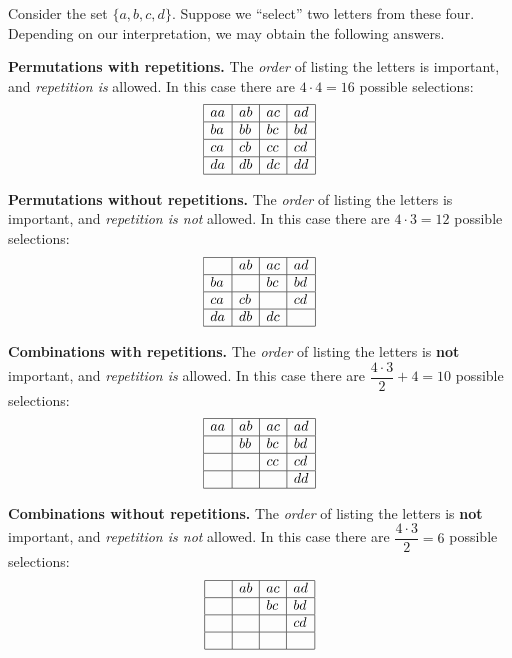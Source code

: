 \begin{exa}
Consider the set $\{a, b, c, d\}$. Suppose we ``select'' two
letters from these four. Depending on our interpretation, we may
obtain the following answers.
\begin{lenum}
\item {\bf Permutations with repetitions.} The {\em order} of listing the letters is important, and
{\em repetition is} allowed. In this case there are $4\cdot 4 =
16$ possible selections: $$\begin{array}{|l|l|l|l|}\hline aa & ab
& ac & ad
\\ \hline ba & bb & bc & bd \\ \hline ca & cb & cc & cd \\ \hline da & db & dc & dd \\ \hline\end{array}
$$
\item {\bf Permutations without repetitions.} The {\em order} of listing the letters is important, and
{\em repetition is not} allowed. In this case there are $4\cdot 3
= 12$ possible selections: $$\begin{array}{|l|l|l|l|}\hline  & ab
& ac & ad
\\ \hline ba &  & bc & bd \\ \hline ca & cb &  & cd \\ \hline da & db & dc & \\ \hline \end{array}
$$
\item {\bf Combinations with repetitions.}  The {\em order} of listing the letters is {\bf not} important, and
{\em repetition is} allowed. In this case there are
$\dfrac{4\cdot 3}{2}+4 = 10$ possible selections:
$$\begin{array}{|l|l|l|l|} \hline aa & ab & ac & ad
\\ \hline & bb & bc & bd \\ \hline  &  & cc & cd \\ \hline &  &  & dd \\ \hline \end{array}
$$
\item {\bf Combinations without repetitions.}  The {\em order} of listing the letters is {\bf not} important, and
{\em repetition is not} allowed. In this case there are
$\dfrac{4\cdot 3}{2} = 6$ possible selections:
$$\begin{array}{|l|l|l|l|}\hline \hspace{.35cm} & ab & ac & ad
\\ \hline  \hspace*{2ex} &  & bc & bd \\ \hline &  &  & cd \\ \hline  &  &  &  \\ \hline \end{array}
$$
\vspace*{0in}
\end{lenum}
\end{exa}

